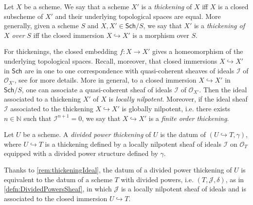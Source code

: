 \begin{defn}[Thickening]
	Let $X$ be a scheme.
	We say that a scheme $X'$ is a \emph{thickening} of $X$ iff
	$X$ is a closed subscheme of $X'$ and their underlying topological
	spaces are equal.
	More generally, given a scheme $S$ and $X, X' \in \mathsf{Sch}/S$,
	we say that $X'$ is a \emph{thickening of $X$ over} $S$ iff
	the closed immersion $X \hookrightarrow X'$ is a morphism over $S$.
\end{defn}


\begin{rem}[]\label{rem:thickeningIdeal}
	For thickenings, the closed embedding $f\colon X \to X'$ gives a homeomorphism
	of the underlying topological spaces.
	Recall, moreover, that closed immersions $X \hookrightarrow X'$ in $\mathsf{Sch}_{  }$
	are in one to one correspondence with quasi-coherent sheaves of ideals
	$\mathcal{I}$ of $\mathcal{O}_{ X' }$, see
	\cite[\href{https://stacks.math.columbia.edu/tag/01QN}{Section 01QN}]{SP}
	for more details.
	More in general, to a closed immersion $X \hookrightarrow X'$ in
	$\mathsf{Sch}/S$, one can associate a quasi-coherent sheaf of ideals
	$\mathcal{I}$ of $\mathcal{O}_{ X' }$.
	Then the ideal associated to a thickening $X'$ of $X$ 
	is \emph{locally nilpotent}.
	Moreover, if the ideal sheaf $\mathcal{I}$ associated to the thickening
	$X \hookrightarrow X'$ is globally nilpotent, i.e. there exists $n \in \mathbb{N}$
	such that $\mathcal{I}^{n+1} = 0$, we say that $X \hookrightarrow X'$ 
	is a \emph{finite order thickening}.
\end{rem}


\begin{defn}\label{defn:PDThickening}
	Let $U$ be a scheme. A \emph{divided power thickening} of $U$ 
	is the datum of $\left(U \hookrightarrow T, \gamma\right)$,
	where $U \hookrightarrow T$ is a thickening defined by a locally nilpotent
	sheaf of ideals $\mathcal{I}$ on $\mathcal{O}_T$ equipped
	with a divided power structure defined by $\gamma$.
\end{defn}


\begin{rem}[]\label{rem:EquivPDThickening}
	Thanks to \cref{rem:thickeningIdeal}, the datum of a
	divided power thickening of $U$ is equivalent to the datum of
	a scheme $T$ with divided powers, i.e.
	$\left(T, \mathcal{J}, \delta\right)$, as in \cref{defn:DividedPowersSheaf},
	in which $\mathcal{J}$ is a locally nilpotent sheaf of ideals
	and is associated to the closed immersion $U \hookrightarrow T$.
\end{rem}


